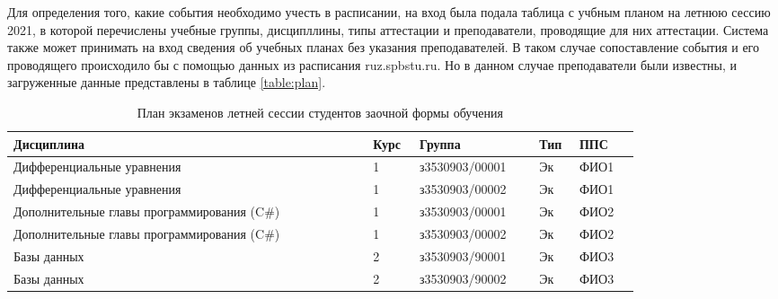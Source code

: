 Для определения того, какие события необходимо учесть в расписании, на вход была подала таблица с учбным планом на летнюю сессию 2021, в которой перечислены учебные группы, дисципллины, типы аттестации и преподаватели, проводящие для них аттестации. Система также может принимать на вход сведения об учебных планах без указания преподавателей. В таком случае сопоставление события и его проводящего происходило бы с помощью данных из расписания ruz.spbstu.ru. Но в данном случае преподаватели были известны, и загруженные данные представлены в таблице \ref{table:plan}.
\begin{table}[htbp]
	\centering\small 
	\caption{План экзаменов летней сессии студентов заочной формы обучения}%
	\begin{tabular}{|p{0.48\linewidth}|p{0.05\linewidth}|p{0.16\linewidth}|p{0.04\linewidth}|p{0.08\linewidth}|}
		\hline
		Дисциплина&Курс&Группа&Тип&ППС \\ 	\hline
		Дифференциальные уравнения                                                    & 1                                                & з3530903/00001                                     & Эк                                                         & ФИО1          \\ 	\hline
		Дифференциальные уравнения                                                    & 1                                                & з3530903/00002                                     & Эк                                                         & ФИО1          \\	\hline
		Дополнительные главы программирования (C\#)                                   & 1                                                & з3530903/00001                                     & Эк                                                         & ФИО2          \\ 	\hline
		Дополнительные главы программирования (C\#)                                   & 1                                                & з3530903/00002                                     & Эк                                                         & ФИО2          \\ 	\hline
		Базы данных                                                                   & 2                                                & з3530903/90001                                     & Эк                                                         & ФИО3          \\	\hline
		Базы данных                                                                   & 2                                                & з3530903/90002                                     & Эк                                                         & ФИО3          \\	\hline

\end{tabular}
\end{table}
